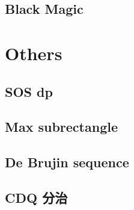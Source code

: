 \documentclass[a4paper,10pt,twocolumn,oneside]{article}
\begin{document}
\subsection{Black Magic}


\section{Others}

\subsection{SOS dp}


\hspace{1cm}\newline

\subsection{Max subrectangle}


%

%

%

%

\subsection{De Brujin sequence}


\subsection{CDQ 分治}

\end{document}
